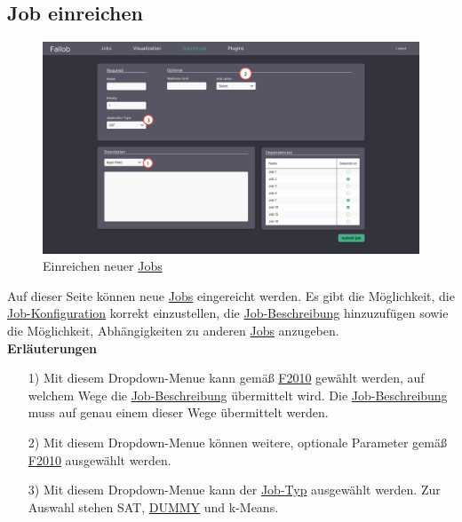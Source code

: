 \subsection{Job einreichen}
\label{pages:submit-job}
\begin{figure}[H]
    \centering
    \includegraphics[width=\textwidth]{images-interface/v4_interface/submit_job_page_4.pdf}
    \caption{Einreichen neuer \hyperref[B:Jobs]{Jobs}}
    \label{fig:submit-job}
\end{figure}
Auf dieser Seite können neue \hyperref[B:Jobs]{Jobs} eingereicht werden. Es gibt die Möglichkeit, die \hyperref[B:Job-Konfiguration]{Job-Konfiguration} korrekt einzustellen, die \hyperref[B:Job-Beschreibung]{Job-Beschreibung} hinzuzufügen sowie die Möglichkeit, Abhängigkeiten zu anderen \hyperref[B:Jobs]{Jobs} anzugeben. \\

\textbf{Erläuterungen}
\begin{itemize}
    \item[1)] Mit diesem \gls{Dropdown-Menue} kann gemäß \hyperref[FA:Web-Interface:Job einreichen]{F2010} gewählt werden, auf welchem Wege die \hyperref[B:Job-Beschreibung]{Job-Beschreibung} übermittelt wird. Die \hyperref[B:Job-Beschreibung]{Job-Beschreibung} muss auf genau einem dieser Wege übermittelt werden.
    \item[2)] Mit diesem \gls{Dropdown-Menue} können weitere, optionale Parameter gemäß \hyperref[FA:Web-Interface:Job einreichen]{F2010} ausgewählt werden. 
    \item[3)] Mit diesem \gls{Dropdown-Menue} kann der \hyperref[B:Job-Typ]{Job-Typ} ausgewählt werden. Zur Auswahl stehen \gls{SAT}, \hyperref[B:Job-Typ]{DUMMY} und \gls{k-Means}.
\end{itemize}

\newpage
